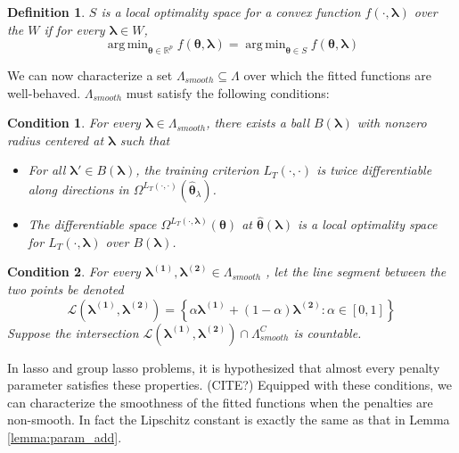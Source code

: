 \documentclass[12pt]{article}
\newtheorem{definition}{Definition}
\newtheorem{condition}{Condition}
\DeclareMathOperator*{\argmin}{arg\,min}
\begin{document}
\begin{definition}
	$S$ is a local optimality space for a convex function $f(\cdot, \boldsymbol \lambda)$ over the $W$ if for every $\boldsymbol \lambda \in W$,
	\begin{equation}
	\argmin_{\boldsymbol{\theta} \in \mathbb{R}^p} f(\boldsymbol{\theta}, \boldsymbol \lambda) =
	\argmin_{\boldsymbol{\theta} \in S} f(\boldsymbol{\theta}, \boldsymbol \lambda)
	\end{equation}
\end{definition}

We can now characterize a set $\Lambda_{smooth} \subseteq \Lambda$ over which the fitted functions are well-behaved. $\Lambda_{smooth}$ must satisfy the following conditions:

\begin{condition}
	\label{condn:nonsmooth1}
	For every $\boldsymbol{\lambda} \in \Lambda_{smooth}$, there exists a ball $B(\boldsymbol{\lambda})$ with nonzero radius centered at $\boldsymbol{\lambda}$ such that
	\begin{itemize}
		\item For all $\boldsymbol{\lambda}'\in B(\boldsymbol{\lambda})$, the training criterion $L_{T}(\cdot,\cdot)$
		is twice differentiable along directions in $\Omega^{L_{T}(\cdot,\cdot)}\left(\hat{\boldsymbol{\theta}}_{\lambda}\right)$.
		\item The differentiable space $\Omega^{L_T(\cdot, \boldsymbol{\lambda})}(\boldsymbol{\theta})$ at $\hat{\boldsymbol \theta}\left(\boldsymbol{\lambda}\right)$ is a local optimality space for $L_T\left(\cdot,\boldsymbol{\lambda}\right)$ over $B(\boldsymbol{\lambda})$.
	\end{itemize}
\end{condition}
\begin{condition}
	\label{condn:nonsmooth2}
	For every $\boldsymbol{\lambda^{(1)}},\boldsymbol{\lambda^{(2)}}\in\Lambda_{smooth}$
	, let the line segment between the two points be denoted 
	$$
	\mathcal{L}(\boldsymbol{\lambda^{(1)}},\boldsymbol{\lambda^{(2)}})=\left\{ \alpha\boldsymbol{\lambda^{(1)}}+(1-\alpha)\boldsymbol{\lambda^{(2)}}:\alpha\in[0,1]\right\} 
	$$
	Suppose the intersection $\mathcal{L}(\boldsymbol{\lambda^{(1)}},\boldsymbol{\lambda^{(2)}})\cap\Lambda_{smooth}^{C}$
	is countable.
\end{condition}
In lasso and group lasso problems, it is hypothesized that almost every penalty parameter satisfies these properties. (CITE?) Equipped with these conditions, we can characterize the smoothness of the fitted functions when the penalties are non-smooth. In fact the Lipschitz constant is exactly the same as that in Lemma \ref{lemma:param_add}.
\end{document}
